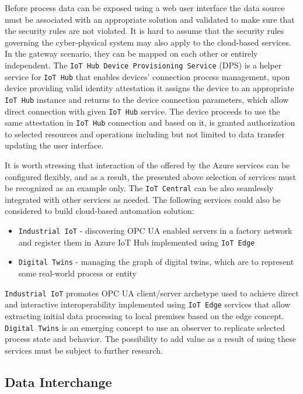\documentclass[
]{article}
\providecommand{\tightlist}{%
  \setlength{\itemsep}{0pt}\setlength{\parskip}{0pt}}
\begin{document}
Before process data can be exposed using a web user interface the data
source must be associated with an appropriate solution and validated to
make sure that the security rules are not violated. It is hard to assume
that the security rules governing the cyber-physical system may also
apply to the cloud-based services. In the gateway scenario, they can be
mapped on each other or entirely independent. The
\texttt{IoT\ Hub\ Device\ Provisioning\ Service} (DPS) is a helper
service for \texttt{IoT\ Hub} that enables devices' connection process
management, upon device providing valid identity attestation it assigns
the device to an appropriate \texttt{IoT\ Hub} instance and returns to
the device connection parameters, which allow direct connection with
given \texttt{IoT\ Hub} service. The device proceeds to use the same
attestation in \texttt{IoT\ Hub} connection and based on it, is granted
authorization to selected resources and operations including but not
limited to data transfer updating the user interface.

It is worth stressing that interaction of the offered by the Azure
services can be configured flexibly, and as a result, the presented
above selection of services must be recognized as an example only. The
\texttt{IoT\ Central} can be also seamlessly integrated with other
services as needed. The following services could also be considered to
build cloud-based automation solution:

\begin{itemize}
\tightlist
\item
  \texttt{Industrial\ IoT} - discovering OPC UA enabled servers in a
  factory network and register them in Azure IoT Hub implemented using
  \texttt{IoT\ Edge}
\item
  \texttt{Digital\ Twins} - managing the graph of digital twins, which
  are to represent some real-world process or entity
\end{itemize}

\texttt{Industrial\ IoT} promotes OPC UA client/server archetype used to
achieve direct and interactive interoperability implemented using
\texttt{IoT\ Edge} services that allow extracting initial data
processing to local premises based on the edge concept.
\texttt{Digital\ Twins} is an emerging concept to use an observer to
replicate selected process state and behavior. The possibility to add
value as a result of using these services must be subject to further
research.

\hypertarget{data-interchange}{%
\subsection{Data Interchange}\label{data-interchange}}
\end{document}
